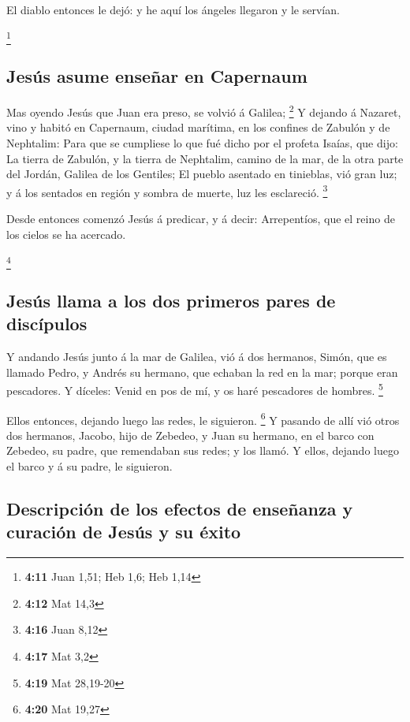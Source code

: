  El diablo entonces le dejó: y he aquí los ángeles llegaron
y le servían.

\footnote{\textbf{4:11} Juan 1,51; Heb 1,6; Heb 1,14}

\hypertarget{jesuxfas-asume-enseuxf1ar-en-capernaum}{%
\subsection{Jesús asume enseñar en
Capernaum}\label{jesuxfas-asume-enseuxf1ar-en-capernaum}}

 Mas oyendo Jesús que Juan era preso, se volvió á Galilea;
\footnote{\textbf{4:12} Mat 14,3}  Y dejando á Nazaret,
vino y habitó en Capernaum, ciudad marítima, en los confines de Zabulón
y de Nephtalim:  Para que se cumpliese lo que fué dicho por
el profeta Isaías, que dijo:  La tierra de Zabulón, y la
tierra de Nephtalim, camino de la mar, de la otra parte del Jordán,
Galilea de los Gentiles;  El pueblo asentado en tinieblas,
vió gran luz; y á los sentados en región y sombra de muerte, luz les
esclareció. \footnote{\textbf{4:16} Juan 8,12}

 Desde entonces comenzó Jesús á predicar, y á decir:
Arrepentíos, que el reino de los cielos se ha acercado.

\footnote{\textbf{4:17} Mat 3,2}

\hypertarget{jesuxfas-llama-a-los-dos-primeros-pares-de-discuxedpulos}{%
\subsection{Jesús llama a los dos primeros pares de
discípulos}\label{jesuxfas-llama-a-los-dos-primeros-pares-de-discuxedpulos}}

 Y andando Jesús junto á la mar de Galilea, vió á dos
hermanos, Simón, que es llamado Pedro, y Andrés su hermano, que echaban
la red en la mar; porque eran pescadores.  Y díceles: Venid
en pos de mí, y os haré pescadores de hombres. \footnote{\textbf{4:19}
  Mat 28,19-20}

 Ellos entonces, dejando luego las redes, le siguieron.
\footnote{\textbf{4:20} Mat 19,27}  Y pasando de allí vió
otros dos hermanos, Jacobo, hijo de Zebedeo, y Juan su hermano, en el
barco con Zebedeo, su padre, que remendaban sus redes; y los llamó.
 Y ellos, dejando luego el barco y á su padre, le
siguieron.

\hypertarget{descripciuxf3n-de-los-efectos-de-enseuxf1anza-y-curaciuxf3n-de-jesuxfas-y-su-uxe9xito}{%
\subsection{Descripción de los efectos de enseñanza y curación de Jesús
y su
éxito}\label{descripciuxf3n-de-los-efectos-de-enseuxf1anza-y-curaciuxf3n-de-jesuxfas-y-su-uxe9xito}}

